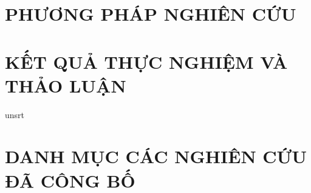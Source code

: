 \documentclass[a4paper,12pt,oneside]{report}
\begin{document}
\chapter{\centering PHƯƠNG PHÁP NGHIÊN CỨU}


\chapter{\centering KẾT QUẢ THỰC NGHIỆM VÀ THẢO LUẬN}


% 



{unsrt}




\chapter*{\centering DANH MỤC CÁC NGHIÊN CỨU ĐÃ CÔNG BỐ}

\end{document}
